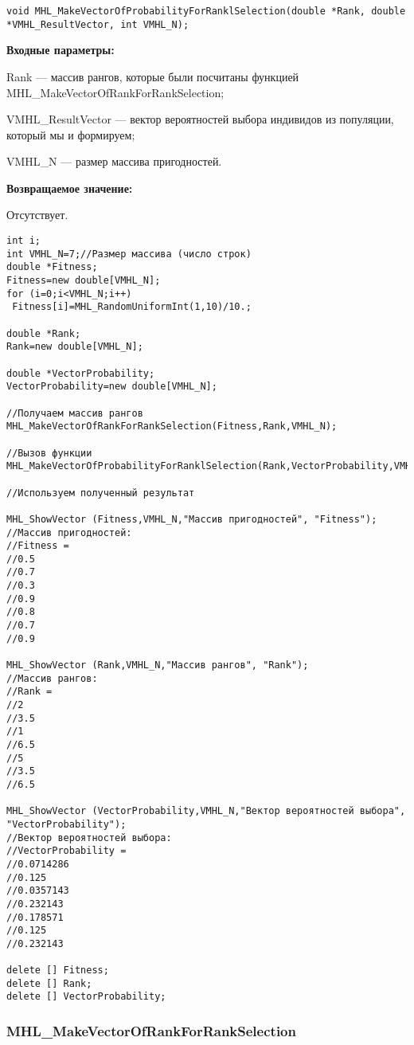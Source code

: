 \documentclass[a4paper,12pt]{article}
\begin{document}
\begin{lstlisting}[label=code_syntax_MHL_MakeVectorOfProbabilityForRanklSelection,caption=Синтаксис]
void MHL_MakeVectorOfProbabilityForRanklSelection(double *Rank, double *VMHL_ResultVector, int VMHL_N);
\end{lstlisting}

\textbf{Входные параметры:}  
 
Rank --- массив рангов, которые были посчитаны функцией MHL\_MakeVectorOfRankForRankSelection;
 
VMHL\_ResultVector --- вектор вероятностей выбора индивидов из популяции, который мы и формируем;
 
VMHL\_N --- размер массива пригодностей.

\textbf{Возвращаемое значение:}

 Отсутствует.


\begin{lstlisting}[label=code_use_MHL_MakeVectorOfProbabilityForRanklSelection,caption=Пример использования]
int i;
int VMHL_N=7;//Размер массива (число строк)
double *Fitness;
Fitness=new double[VMHL_N];
for (i=0;i<VMHL_N;i++)
 Fitness[i]=MHL_RandomUniformInt(1,10)/10.;

double *Rank;
Rank=new double[VMHL_N];

double *VectorProbability;
VectorProbability=new double[VMHL_N];

//Получаем массив рангов
MHL_MakeVectorOfRankForRankSelection(Fitness,Rank,VMHL_N);

//Вызов функции
MHL_MakeVectorOfProbabilityForRanklSelection(Rank,VectorProbability,VMHL_N);

//Используем полученный результат

MHL_ShowVector (Fitness,VMHL_N,"Массив пригодностей", "Fitness");
//Массив пригодностей:
//Fitness =
//0.5
//0.7
//0.3
//0.9
//0.8
//0.7
//0.9

MHL_ShowVector (Rank,VMHL_N,"Массив рангов", "Rank");
//Массив рангов:
//Rank =
//2
//3.5
//1
//6.5
//5
//3.5
//6.5

MHL_ShowVector (VectorProbability,VMHL_N,"Вектор вероятностей выбора", "VectorProbability");
//Вектор вероятностей выбора:
//VectorProbability =
//0.0714286
//0.125
//0.0357143
//0.232143
//0.178571
//0.125
//0.232143

delete [] Fitness;
delete [] Rank;
delete [] VectorProbability;
\end{lstlisting}

\subsubsection{MHL\_MakeVectorOfRankForRankSelection}\label{MHL_MakeVectorOfRankForRankSelection}
\end{document}
